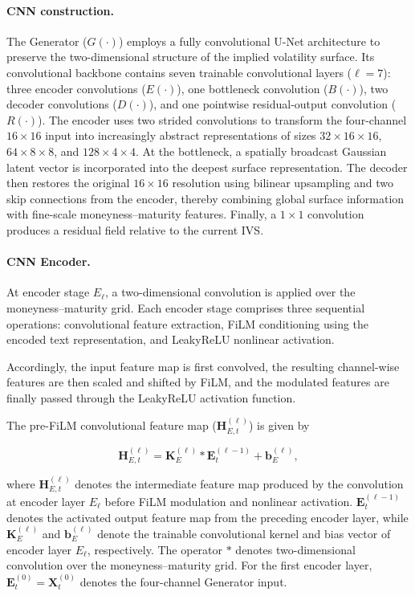 \paragraph*{CNN construction.}
The Generator ($G(\cdot)$) employs a fully convolutional U-Net architecture to preserve the two-dimensional structure of the implied volatility surface. Its convolutional backbone contains seven trainable convolutional layers ($\ell=7$): three encoder convolutions ($E(\cdot)$), one bottleneck convolution ($B(\cdot)$), two decoder convolutions ($D(\cdot)$), and one pointwise residual-output convolution ($R(\cdot)$). The encoder uses two strided convolutions to transform the four-channel $16\times16$ input into increasingly abstract representations of sizes $32\times16\times16$,
$64\times8\times8$, and $128\times4\times4$. At the bottleneck, a spatially
broadcast Gaussian latent vector is incorporated into the deepest surface
representation. The decoder then restores the original $16\times16$ resolution
using bilinear upsampling and two skip connections from the encoder, thereby
combining global surface information with fine-scale moneyness--maturity
features. Finally, a $1\times1$ convolution produces a residual field relative
to the current IVS.




\paragraph*{CNN Encoder.}

At encoder stage $E_{\ell}$, a two-dimensional convolution is applied over the
moneyness--maturity grid. Each encoder stage comprises three sequential
operations: convolutional feature extraction, FiLM conditioning using the
encoded text representation, and LeakyReLU nonlinear activation.

Accordingly, the input feature map is first convolved, the resulting channel-wise features are then scaled and shifted by FiLM, and the modulated features are finally passed through the LeakyReLU activation function.

The pre-FiLM convolutional feature map ($\mathbf{H}^{(\ell)}_{E,t}$) is given by

\begin{equation}\label{eq:ch3:encoder_convolution}
\mathbf{H}^{(\ell)}_{E,t}
=
\mathbf{K}^{(\ell)}_{E}
\ast
\mathbf{E}^{(\ell-1)}_t
+
\mathbf{b}^{(\ell)}_{E},
\end{equation}

where $\mathbf{H}^{(\ell)}_{E,t}$ denotes the intermediate feature map produced by the convolution at encoder layer $E_{\ell}$ before FiLM modulation and nonlinear activation. $\mathbf{E}^{(\ell-1)}_t$ denotes the activated output feature map from the preceding encoder layer, while $\mathbf{K}^{(\ell)}_{E}$ and $\mathbf{b}^{(\ell)}_{E}$ denote the trainable convolutional kernel and bias vector of encoder layer $E_{\ell}$, respectively. The operator $\ast$ denotes two-dimensional convolution over the moneyness--maturity grid. For the first encoder layer, $\mathbf{E}^{(0)}_t=\mathbf{X}^{(0)}_t$ denotes the four-channel Generator input.


